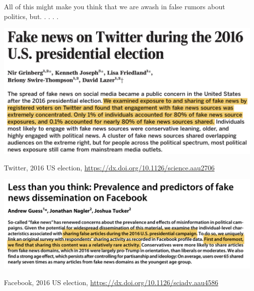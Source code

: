 \documentclass[aspectratio=169]{beamer}
\begin{document}
\begin{frame} 

All of this might make you think that we are awash in false rumors about politics, but. . . . .

\end{frame}
\begin{frame} 

\begin{center}
\includegraphics[width=\textwidth]{figures/grinberg_fake_2019_titleabstract}
\end{center}

\vfill
Twitter, 2016 US election, \url{https://dx.doi.org/10.1126/science.aau2706}

\end{frame}
\begin{frame} 

\begin{center}
\includegraphics[width=\textwidth]{figures/guess_less_2019_titleabstract}
\end{center}

\vfill
Facebook, 2016 US election, \url{https://dx.doi.org/10.1126/sciadv.aau4586}

\end{frame}
\end{document}
